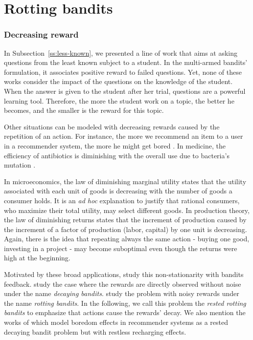 \part{Rotting bandits}
\section*{Decreasing reward}
In Subsection~\ref{ss:less-known}, we presented a line of work that aims at asking questions from the least known subject to a student. In the multi-armed bandits' formulation, it associates positive reward to failed questions. Yet, none of these works consider the impact of the questions on the knowledge of the student. When the answer is given to the student after her trial, questions are a powerful learning tool. Therefore, the more the student work on a topic, the better he becomes, and the smaller is the reward for this topic.

Other situations can be modeled with decreasing rewards caused by the repetition of an action. For instance, the more we recommend an item to a user in a recommender system, the more he might get bored \citep{warlop2018fighting}. In medicine, the efficiency of antibiotics is diminishing with the overall use due to bacteria's mutation \citep{ventola2015antibiotic, ventola2015antibiotic2}.

In microeconomics, the law of diminishing marginal utility states that the utility associated with each unit of goods is decreasing with the number of goods a consumer holds. It is an \emph{ad hoc} explanation to justify that rational consumers, who maximize their total utility, may select different goods. In production theory, the law of diminishing returns \citep{canan1892origin} states that the increment of production caused by the increment of a factor of production (labor, capital) by one unit is decreasing. Again, there is the idea that repeating always the same action - buying one good, investing in a project - may become suboptimal even though the returns were high at the beginning. 

Motivated by these broad applications, \citet{heidari2016tight, levine2017rotting} study this non-stationarity with bandits feedback.  \citet{heidari2016tight} study the case where the rewards are directly observed without noise under the name \emph{decaying bandits}. \citet{levine2017rotting} study the problem with noisy rewards under the name \emph{rotting bandits}. In the following, we call this problem the \emph{rested rotting bandits} to emphasize that actions cause the rewards' decay. We also mention the works of \citet{warlop2018fighting, immorlica2018recharging, pikeburke2019recovering} which model boredom effects in recommender systems as a rested decaying bandit problem but with restless recharging effects. 

